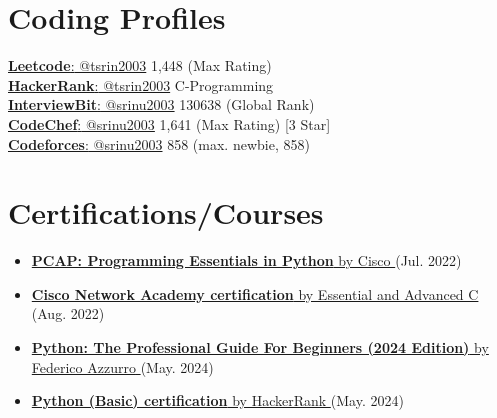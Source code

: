 \documentclass[a4paper,11pt]{article}
\newcommand{\resumeItem}[1]{\item\small{{#1 \vspace{-2pt}}}}
\newcommand{\resumeItemListStart}{\begin{itemize}}
\newcommand{\resumeItemListEnd}{\end{itemize}\vspace{-5pt}}
\begin{document}
\vspace{-12pt}
\section{Coding Profiles}
\begin{multicols}{2}
  \begin{itemize}[leftmargin=0.15in, label={}]
    \small{\item{
      \href{https://leetcode.com/tsrin2003/}{\underline{\textbf{Leetcode}}{:} @tsrin2003} 1,448 (Max Rating) \\
      \href{https://www.hackerrank.com/tsrin2003}{\underline{\textbf{HackerRank}}{:} @tsrin2003} C-Programming \\
      \href{https://www.interviewbit.com/profile/srinu2003/}{\underline{\textbf{InterviewBit}}{:} @srinu2003} 130638 (Global Rank) \\
      \href{https://www.codechef.com/users/srinu2003}{\underline{\textbf{CodeChef}}{:} @srinu2003} 1,641 (Max Rating) [3 Star] \\
      \href{https://codeforces.com/profile/srinu2003}{\underline{\textbf{Codeforces}}{:} @srinu2003} 858 (max. newbie, 858) \\
      }
    }
  \end{itemize}
\end{multicols}

\vspace{-3pt}
  \section{Certifications/Courses}
    \resumeItemListStart[parsep = 0pt]
      \resumeItem{\href{https://drive.google.com/file/d/1ciuy0EC8fBujuxVOcZ--oUG9OZ8eHr5D/view?usp=drive_link}
                        {\textbf{PCAP: Programming Essentials in Python} by Cisco \faExternalLink*} (Jul. 2022)}
      \resumeItem{\href{https://drive.google.com/file/d/1w72XSRwblf5AqqEBGvnUbvUayJTcpWO-/view?usp=drive_link}
                        {\textbf{Cisco Network Academy certification} by Essential and Advanced C \faExternalLink*} (Aug. 2022)}
      \resumeItem{\href{https://www.udemy.com/certificate/UC-79138624-8361-423b-b131-42765a08db12/}
                        {\textbf{Python: The Professional Guide For Beginners (2024 Edition)} by \href{https://www.linkedin.com/in/federicoazzu/}{Federico Azzurro} \faExternalLink*} (May. 2024)}
      \resumeItem{\href{https://www.hackerrank.com/certificates/607a2d4d88f1}
                        {\textbf{Python (Basic) certification} by HackerRank \faExternalLink*} (May. 2024)}
    \resumeItemListEnd
\end{document}
